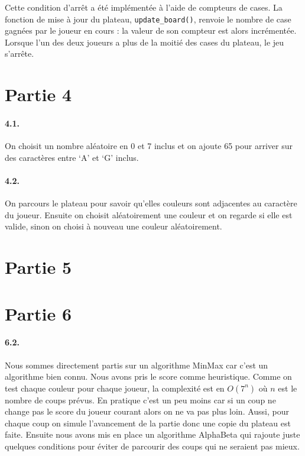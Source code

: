 \documentclass[a4paper]{article}
\begin{document}
Cette condition d'arrêt a été implémentée à l'aide de compteurs de cases. La 
fonction de mise à jour du plateau, \texttt{update_board()}, renvoie le nombre 
de case gagnées par le joueur en cours : la valeur de son compteur est alors 
incrémentée. Lorsque l'un des deux joueurs a plus de la moitié des cases du 
plateau, le jeu s'arrête.
    \section{Partie 4}
    \paragraph{4.1.} On choisit un nombre aléatoire en 0 et 7 inclus et on
    ajoute 65 pour arriver sur des caractères entre `A' et `G' inclus.

    \paragraph{4.2.} On parcours le plateau pour savoir qu'elles couleurs sont
    adjacentes au caractère du joueur. Ensuite on choisit aléatoirement une
    couleur et on regarde si elle est valide, sinon on choisi à nouveau une 
    couleur aléatoirement.

    \section{Partie 5}

    \section{Partie 6}
    \paragraph{6.2.} Nous sommes directement partis sur un algorithme MinMax
    car c'est un algorithme bien connu. Nous avons pris le score comme
    heuristique. Comme on test chaque couleur pour chaque joueur, la complexité
    est en $O(7^n)$ où $n$ est le nombre de coups prévus. En pratique c'est un
    peu moins car si un coup ne change pas le score du joueur courant alors on
    ne va pas plus loin. Aussi, pour chaque coup on simule l'avancement de la 
    partie donc une copie du plateau est faite. Ensuite nous avons mis en place 
    un algorithme AlphaBeta qui rajoute juste quelques conditions pour éviter 
    de parcourir des coups qui ne seraient pas mieux.
\end{document}

